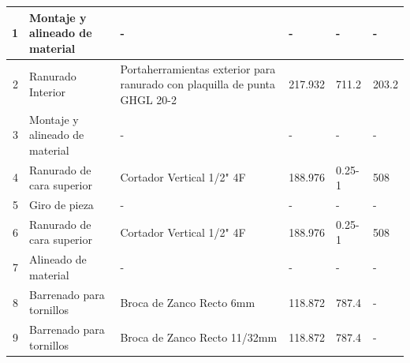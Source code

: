 \begin{table}[H]
\begin{tabular}{|r|p{10.75em}|p{11em}|p{3em}|p{3.25em}|p{3.5em}|}
    \hline
    \scriptsize 1     & \scriptsize Montaje y alineado de material & \scriptsize -     & \scriptsize {-} & \scriptsize{-} & \scriptsize - \\
    \hline
     \scriptsize 2     & \scriptsize Ranurado Interior & \scriptsize Portaherramientas exterior para ranurado con plaquilla de punta GHGL 20-2 & \scriptsize 217.932 & \scriptsize 711.2 & \scriptsize 203.2 \\
     \hline
    \scriptsize 3     & \scriptsize Montaje y alineado de material & \scriptsize -     & \scriptsize {-} & \scriptsize{-} & \scriptsize - \\
    \hline
    \scriptsize 4     & \scriptsize Ranurado de cara superior & \scriptsize Cortador Vertical 1/2" 4F & \scriptsize 188.976 & \scriptsize 0.25-1 & \scriptsize 508 \\
    \hline
     \scriptsize 5     & \scriptsize Giro de pieza & \scriptsize -     & \scriptsize {-} & \scriptsize{-} & \scriptsize - \\
    \hline
    \scriptsize 6    & \scriptsize Ranurado de cara superior & \scriptsize Cortador Vertical 1/2" 4F & \scriptsize 188.976 & \scriptsize 0.25-1 & \scriptsize 508 \\
    \hline
    \scriptsize 7     & \scriptsize Alineado de material & \scriptsize -     & \scriptsize {-} & \scriptsize{-} & \scriptsize - \\
   \hline
    \scriptsize 8     & \scriptsize Barrenado para tornillos & \scriptsize Broca de Zanco Recto 6mm & \scriptsize 118.872 & \scriptsize 787.4 & \scriptsize - \\
    \hline
    \scriptsize 9     & \scriptsize Barrenado para tornillos & \scriptsize Broca de Zanco Recto 11/32mm & \scriptsize 118.872 & \scriptsize 787.4 & \scriptsize - \\
    \hline
    \end{tabular}%
  \label{tab:AZ_MC2}%
\end{table}%



